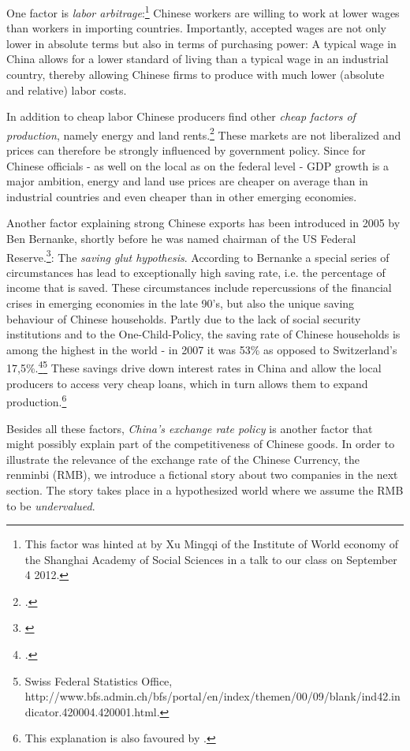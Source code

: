 One factor is \emph{labor arbitrage}:\footnote{This factor was hinted at by Xu Mingqi of the Institute of World economy of the Shanghai Academy of Social Sciences in a talk to our class on September 4 2012.} Chinese workers are willing to work at lower wages than workers in importing countries. Importantly, accepted wages are not only lower in absolute terms but also in terms of purchasing power: A typical wage in China allows for a lower standard of living than a typical wage in an industrial country, thereby allowing Chinese firms to produce with much lower (absolute and relative) labor costs. 

In addition to cheap labor Chinese producers find other \emph{cheap factors of production}, namely energy and land rents.\footnote{\cite[pp. 25]{Huang2010}.} These markets are not liberalized and prices can therefore be strongly influenced by government policy. Since for Chinese officials - as well on the local as on the federal level - GDP growth is a major ambition, energy and land use prices are cheaper on average than in industrial countries and even cheaper than in other emerging economies.

Another factor explaining strong Chinese exports has been introduced in 2005 by Ben Bernanke, shortly before he was named chairman of the US Federal Reserve.\footnote{\cite{Bernanke2005}}: The \emph{saving glut hypothesis}. According to Bernanke a special series of circumstances has lead to exceptionally high saving rate, i.e. the percentage of income that is saved. These circumstances include repercussions of the financial crises in emerging economies in the late 90's, but also the unique saving behaviour of Chinese households. Partly due to the lack of social security institutions and to the One-Child-Policy, the saving rate of Chinese households is among the highest in the world - in 2007 it was 53\% as opposed to Switzerland's 17,5\%.\footnote{\cite[pp. 20]{Taoyang2011}.}\footnote{Swiss Federal Statistics Office, http://www.bfs.admin.ch/bfs/portal/en/index/themen/00/09/blank/ind42.indicator.420004.420001.html.} These savings drive down interest rates in China and allow the local producers to access very cheap loans, which in turn allows them to expand production.\footnote{This explanation is also favoured by \cite[pp. 41]{Wyplosz2010}.}

Besides all these factors, \emph{China's exchange rate policy} is another factor that might possibly explain part of the competitiveness of Chinese goods. In order to illustrate the relevance of the exchange rate of the Chinese Currency, the renminbi (RMB), we introduce a fictional story about two companies in the next section. The story takes place in a hypothesized world where we assume the RMB to be \emph{undervalued}. 





